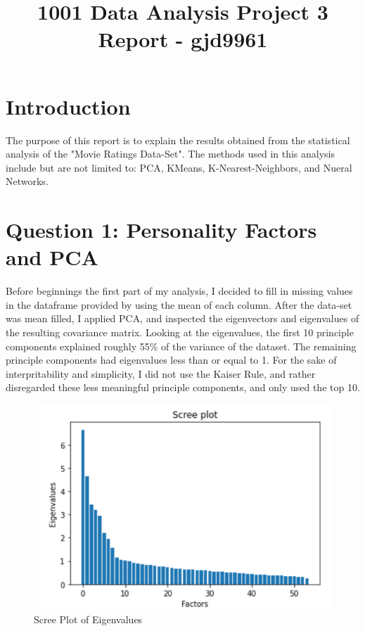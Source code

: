 \documentclass[12pt,twoside]{article}
\title{1001 Data Analysis Project 3 Report - gjd9961}
\begin{document}
\maketitle

\section*{Introduction}

The purpose of this report is to explain the results obtained from the statistical analysis of the "Movie Ratings Data-Set". The methods used in this analysis include but are not limited to: PCA, KMeans, K-Nearest-Neighbors, and Nueral Networks.  

\section*{Question 1: Personality Factors and PCA}

Before beginnings the first part of my analysis, I decided to fill in missing values in the dataframe provided by using the mean of each column. After the data-set was mean filled, I applied PCA, and inspected the eigenvectors and eigenvalues of the resulting covariance matrix. Looking at the eigenvalues, the first 10 principle components explained roughly 55\% of the variance of the dataset. The remaining principle components had eigenvalues less than or equal to 1. For the sake of interpritability and simplicity, I did not use the Kaiser Rule, and rather disregarded these less meaningful principle components, and only used the top 10.

\begin{figure}[h!]
    \centering
    \includegraphics[scale=.9]{scree plot.png}
    \caption{Scree Plot of Eigenvalues}
    \label{fig:my_label}
\end{figure}
\end{document}
